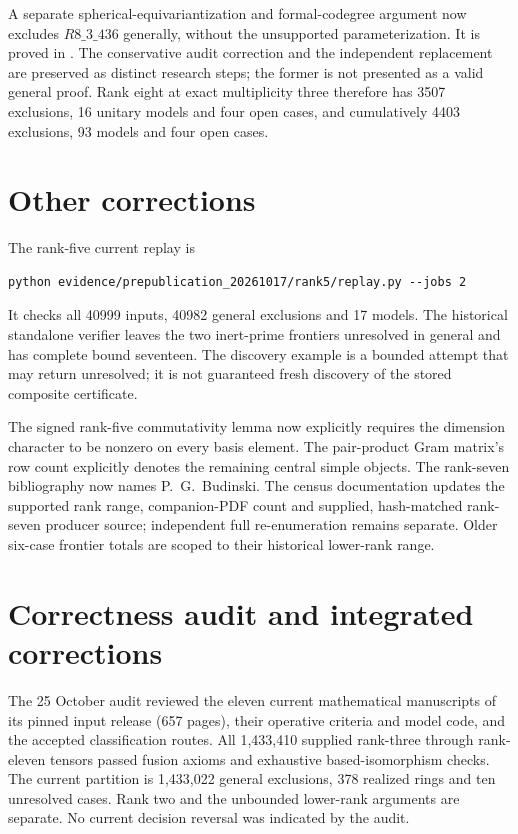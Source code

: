 \documentclass[11pt,a4paper]{article}
\begin{document}
A separate spherical-equivariantization and formal-codegree argument
now excludes $R8\_3\_436$ generally, without the unsupported
parameterization. It is proved in
. The conservative audit correction
and the independent replacement are preserved as distinct research
steps; the former is not presented as a valid general proof.
Rank eight at exact multiplicity three therefore has 3507 exclusions,
16 unitary models and four open cases, and cumulatively 4403 exclusions,
93 models and four open cases.

\section{Other corrections}
The rank-five current replay is
\begin{verbatim}
python evidence/prepublication_20261017/rank5/replay.py --jobs 2
\end{verbatim}
It checks all 40999 inputs, 40982 general exclusions and 17 models.
The historical standalone verifier leaves the two inert-prime frontiers
unresolved in general and has complete bound seventeen. The discovery example
is a bounded attempt that may return unresolved; it is not guaranteed fresh
discovery of the stored composite certificate.

The signed rank-five commutativity lemma now explicitly requires the dimension
character to be nonzero on every basis element. The pair-product Gram matrix's
row count explicitly denotes the remaining central simple objects. The
rank-seven bibliography now names P.~G.~Budinski. The census documentation
updates the supported rank range, companion-PDF count and supplied, hash-matched
rank-seven producer source; independent full re-enumeration remains separate.
Older six-case frontier totals are scoped to their historical lower-rank range.

\section{Correctness audit and integrated corrections}
The 25 October audit reviewed the eleven current mathematical manuscripts
of its pinned input release (657 pages), their operative criteria and
model code, and the accepted classification routes. All 1,433,410 supplied
rank-three through rank-eleven tensors passed fusion axioms and exhaustive
based-isomorphism checks. The current partition is 1,433,022 general
exclusions, 378 realized rings and ten unresolved cases. Rank two and the
unbounded lower-rank arguments are separate. No current decision reversal
was indicated by the audit.
\end{document}
